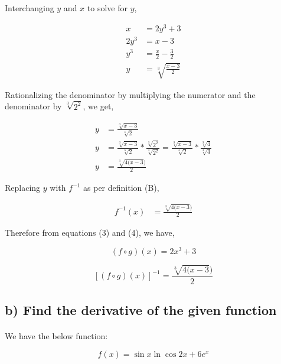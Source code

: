 \documentclass[a4paper]{report}
\begin{document}
\newpage Interchanging $y$ and $x$ to solve for $y$,

\begin{align*}
    x&= 2{y^3}+3 \\
    2{y^3}&= x-3 \\
    y^3&= \frac{x}{2}-\frac{3}{2}\\
    y&=\sqrt[3]{\frac{x-3}{2}}
\end{align*}

Rationalizing the denominator by multiplying the numerator and the denominator by ${\sqrt[3]{2^2}}$, we get,

\begin{align*}
    y&=\frac{\sqrt[3]{x-3}}{\sqrt[3]2} \\
    y&=\frac{\sqrt[3]{x-3}}{\sqrt[3]2} * \frac{{\sqrt[3]{2^2}}}{{\sqrt[3]{2^2}}} 
  =\frac{\sqrt[3]{x-3}}{\sqrt[3]2} * \frac{{\sqrt[3]4}}{{\sqrt[3]4}}\\
    y&=\frac{\sqrt[3]{4(x-3})}{2}
\end{align*}

Replacing $y$ with $f^{-1}$ as per definition (B),

\begin{align}
    f^{-1}(x)&=\frac{\sqrt[3]{4(x-3})}{2}
\end{align}


Therefore from equations (3) and (4), we have,

\begin{equation*}
    \boxed{(f{\circ}g)(x) = 2{x^3}+3}
\end{equation*}


\begin{equation*}
    \boxed{[(f{\circ}g)(x)]^{-1} = \frac{\sqrt[3]{4(x-3})}{2}}
\end{equation*}




\subsection*{b) Find the derivative of the given function }

\paragraph{}

We have the below function:

\begin{equation*}
    f(x)=\sin x \ln \cos 2x+6{e^x}
\end{equation*}
\end{document}
